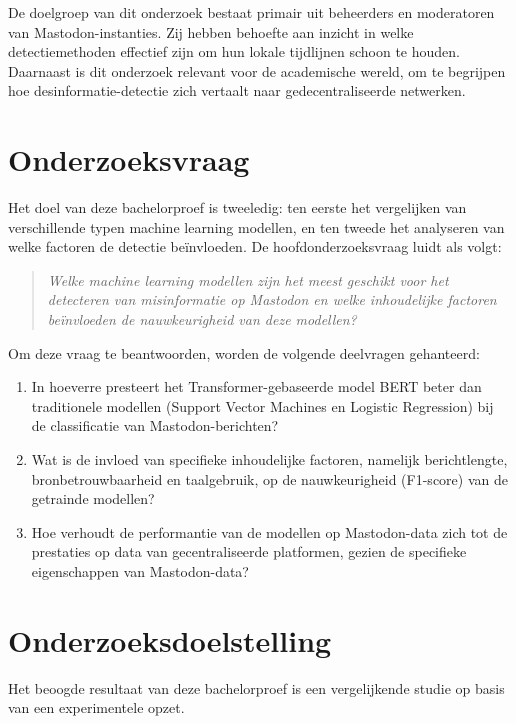 \documentclass[a4paper,11pt]{report}
\begin{document}
De doelgroep van dit onderzoek bestaat primair uit beheerders en moderatoren van Mastodon-instanties. Zij hebben behoefte aan inzicht in welke detectiemethoden effectief zijn om hun lokale tijdlijnen schoon te houden. Daarnaast is dit onderzoek relevant voor de academische wereld, om te begrijpen hoe desinformatie-detectie zich vertaalt naar gedecentraliseerde netwerken.

\section{Onderzoeksvraag}
\label{sec:onderzoeksvraag}

Het doel van deze bachelorproef is tweeledig: ten eerste het vergelijken van verschillende typen machine learning modellen, en ten tweede het analyseren van welke factoren de detectie beïnvloeden. De hoofdonderzoeksvraag luidt als volgt:

\begin{quote}
    \textit{Welke machine learning modellen zijn het meest geschikt voor het detecteren van misinformatie op Mastodon en welke inhoudelijke factoren beïnvloeden de nauwkeurigheid van deze modellen?}
\end{quote}

Om deze vraag te beantwoorden, worden de volgende deelvragen gehanteerd:
\begin{enumerate}
    \item In hoeverre presteert het Transformer-gebaseerde model BERT beter dan traditionele modellen (Support Vector Machines en Logistic Regression) bij de classificatie van Mastodon-berichten?
    \item Wat is de invloed van specifieke inhoudelijke factoren, namelijk berichtlengte, bronbetrouwbaarheid en taalgebruik, op de nauwkeurigheid (F1-score) van de getrainde modellen?
    \item Hoe verhoudt de performantie van de modellen op Mastodon-data zich tot de prestaties op data van gecentraliseerde platformen, gezien de specifieke eigenschappen van Mastodon-data?
\end{enumerate}

\section{Onderzoeksdoelstelling}
\label{sec:onderzoeksdoelstelling}

Het beoogde resultaat van deze bachelorproef is een vergelijkende studie op basis van een experimentele opzet.
\end{document}
